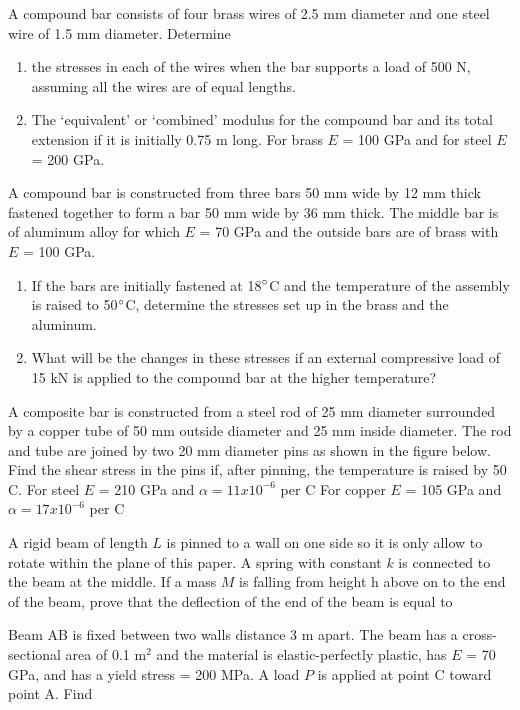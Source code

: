 \documentclass[
10pt,
a4paper,
openany,
svgnames,
]{book} %
\begin{document}
\begin{exercises}

  \exercise A compound bar consists of four brass wires of 2.5 mm diameter and one steel wire of 1.5 mm diameter. Determine
  \begin{enumerate}
  \item the stresses in each of the wires when the bar supports a load of 500 N, assuming all the wires are of equal lengths.
  \item The ‘equivalent’ or ‘combined’ modulus for the compound bar and its total extension if it is initially 0.75 m long. 
    For brass $E$ = 100 GPa and for steel $E$ = 200 GPa.
  \end{enumerate}

  \exercise A compound bar is constructed from three bars 50 mm wide by 12 mm thick fastened together to form a bar 50 mm wide by 36 mm thick. The middle bar is of aluminum alloy for which $E$ = 70 GPa and the outside bars are of brass with $E$ = 100 GPa.
  \begin{enumerate}
  \item If the bars are initially fastened at 18$\degree$C and the temperature of the assembly is raised to 50$\degree$C, determine the stresses set up in the brass and the aluminum.
    
  \item What will be the changes in these stresses if an external compressive load of 15 kN is applied to the compound bar at the higher temperature?
  \end{enumerate}
    
  \exercise A composite bar is constructed from a steel rod of 25 mm diameter surrounded by a copper tube of 50 mm outside diameter and 25 mm inside diameter. The rod and tube are joined by two 20 mm diameter pins as shown in the figure below. Find the shear stress in the pins if, after pinning, the temperature is raised by 50 C.
  For steel $E$ = 210 GPa and $\alpha = 11 x 10^{-6}$ per C
  For copper $E$ = 105 GPa and $\alpha = 17 x 10^{-6}$ per C
  
  \exercise A rigid beam of length $L$ is pinned to a wall on one side so it is only allow to rotate within the plane of this paper. A spring with constant $k$ is connected to the beam at the middle. If a mass $M$ is falling from height h above on to the end of the beam, prove that the deflection of the end of the beam is equal to
  
  \exercise Beam AB is fixed between two walls distance 3 m apart. The beam has a cross-sectional area of 0.1 m$^2$ and the material is elastic-perfectly plastic, has $E$ = 70 GPa, and has a yield stress = 200 MPa. A load $P$ is applied at point C toward point A. Find
  

\end{exercises}
\end{document}
